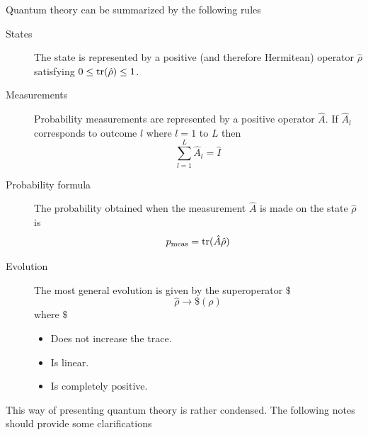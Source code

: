 \documentclass[12pt]{article}
\begin{document}
Quantum theory can be summarized by the following rules
\begin{description}
\item[States] The state is represented by a positive (and therefore Hermitean)
operator $\hat{\rho}$ satisfying $0\leq {\rm tr}(\hat{\rho})\leq 1$.
\item[Measurements] Probability measurements are represented by a
positive operator $\hat{A}$.  If $\hat{A}_l$ corresponds to outcome $l$
where $l=1$ to $L$ then
\begin{equation}
\sum_{l=1}^L \hat{A}_l = \hat{I}
\end{equation}
\item[Probability formula] The probability obtained when the measurement
$\hat{A}$ is made on the state $\hat{\rho}$ is
\begin{equation}\label{traceeqn}
p_{\rm meas}={\rm tr}(\hat{A}\hat{\rho})
\end{equation}
\item[Evolution] The most general evolution is given by the
superoperator $\$ $
\begin{equation}
\hat{\rho}\rightarrow \$ (\rho)
\end{equation}
where $\$ $
\begin{itemize}
\item Does not increase the trace.
\item Is linear.
\item Is completely positive.
\end{itemize}
\end{description}
This way of presenting quantum theory is rather condensed.  The
following notes should provide some clarifications
\end{document}
